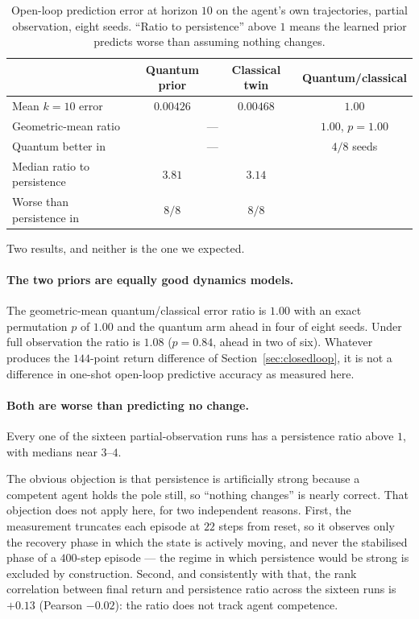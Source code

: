\documentclass[11pt,onecolumn]{article}
\begin{document}
\begin{table}[htb]\centering\small
\caption{Open-loop prediction error at horizon $10$ on the agent's own
trajectories, partial observation, eight seeds. ``Ratio to
persistence'' above $1$ means the learned prior predicts worse than
assuming nothing changes.}
\label{tab:imagination}
\begin{tabular}{lccc}
\toprule
& Quantum prior & Classical twin & Quantum/classical \\
\midrule
Mean $k{=}10$ error      & $0.00426$ & $0.00468$ & $1.00$ \\
Geometric-mean ratio     & \multicolumn{2}{c}{---} & $1.00$, $p = 1.00$ \\
Quantum better in        & \multicolumn{2}{c}{---} & $4/8$ seeds \\
\midrule
Median ratio to persistence & $3.81$ & $3.14$ & \\
Worse than persistence in   & $8/8$  & $8/8$  & \\
\bottomrule
\end{tabular}
\end{table}

Two results, and neither is the one we expected.

\paragraph{The two priors are equally good dynamics models.}
The geometric-mean quantum/classical error ratio is $1.00$ with an exact
permutation $p$ of $1.00$ and the quantum arm ahead in four of eight
seeds. Under full observation the ratio is $1.08$ ($p = 0.84$, ahead in
two of six). Whatever produces the $144$-point return difference of
Section~\ref{sec:closedloop}, it is not a difference in one-shot
open-loop predictive accuracy as measured here.

\paragraph{Both are worse than predicting no change.}
Every one of the sixteen partial-observation runs has a
persistence ratio above $1$, with medians near $3$--$4$.

The obvious objection is that persistence is artificially strong because
a competent agent holds the pole still, so ``nothing changes'' is nearly
correct. That objection does not apply here, for two independent
reasons. First, the measurement truncates each episode at $22$ steps
from reset, so it observes only the recovery phase in which the state is
actively moving, and never the stabilised phase of a $400$-step
episode --- the regime in which persistence would be strong is excluded
by construction. Second, and consistently with that, the rank
correlation between final return and persistence ratio across the
sixteen runs is $+0.13$ (Pearson $-0.02$): the ratio does not track
agent competence.
\end{document}
